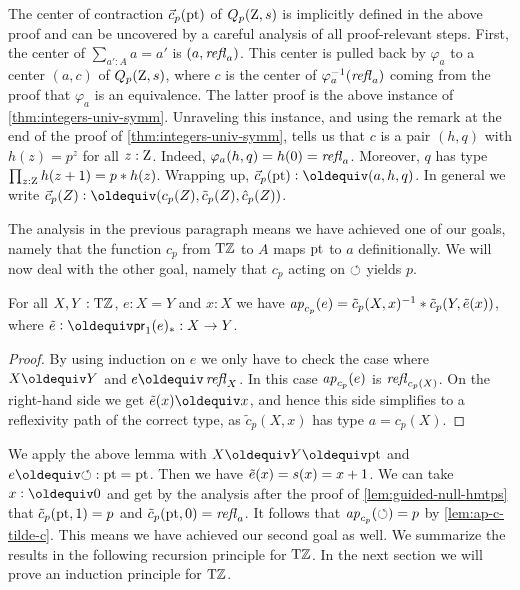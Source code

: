 \documentclass[a4,12pt]{amsart}
\begin{document}
The center of contraction $\vec{c}_p({\mathord{\mathrm{pt}}})$ of $Q_p(\mathrm{Z},s)$ is 
implicitly defined in the above proof 
and can be uncovered by a careful analysis of all proof-relevant steps.
First, the center of $\sum_{a':A} a=a'$ is $(a,\mathop{{\it refl}_{a}})$.
This center is pulled back by $\varphi_{a}$ to a center
$(a,c)$ of $Q_p(\mathrm{Z},s)$, where $c$ is the center of 
$\varphi_{a}^{-1}(\mathop{{\it refl}_{a}})$ coming from the proof
that $\varphi_{a}$ is an equivalence. The latter proof
is the above instance of \cref{thm:integers-univ-symm}.
Unraveling this instance, and using the remark at the
end of the proof of \cref{thm:integers-univ-symm},
tells us that $c$ is a pair $(h,q)$ with $h(z)=p^z$
for all $z:\mathrm{Z}$. Indeed, $\varphi_{a}(h,q) = h(0) = \mathop{{\it refl}_{a}}$.
Moreover, $q$ has type $\prod_{z:\mathrm{Z}} h(z+1)=p* h(z)$.
Wrapping up, $\vec c_p(\pt)\defeq (a,h,q)$. In general we write
$\vec{c}_p(Z)\defeq(c_p(Z),\tilde{c}_p(Z),\hat{c}_p(Z))$.

The analysis in the previous paragraph
means we have achieved one of our goals,
namely that the function $c_p$ from ${\mathrm{T}\mathbb{Z}}$ to $A$ 
maps ${\mathord{\mathrm{pt}}}$ to $a$ definitionally.
We will now deal with the other goal,
namely that $c_p$ acting on $\circlearrowleft$ yields $p$.

\begin{lemma}\label{lem:ap-c-tilde-c}
For all $X,Y:{\mathrm{T}\mathbb{Z}}$, $e: X=Y$ and $x:X$ we have
$\mathop{{\it ap}_{c_p}}(e) = \tilde c_p(X,x)^{-1}* \tilde c_p(Y,\tilde {e}(x))$,
where $\ptoe{e}\defeq \mathsf{pr}_1(e)_* : X\to Y$.
\end{lemma}
\begin{proof}
By using induction on $e$ we only have to check the case where
$X\jdeq Y$ and $e\jdeq\refl{X}$. In this case $\mathop{{\it ap}_{c_p}}(e)$ is
$\mathop{{\it refl}_{c_p(X)}}$. On the right-hand side we get $\ptoe{e}(x)\jdeq x$,
and hence this side simplifies to a reflexivity path of
the correct type, as $\tilde c_p(X,x)$ has type $a=c_p(X)$.
\end{proof}

We apply the above lemma with $X\jdeq Y\jdeq \pt$ and $e\jdeq{\Zloop}: \pt=\pt$.
Then we have $\tilde {e}(x)=s(x)=x+1$. We can take $x\defeq 0$ and get by
the analysis after the proof of \cref{lem:guided-null-hmtps}
that $\tilde c_p({\mathord{\mathrm{pt}}},1) = p$ and $\tilde c_p({\mathord{\mathrm{pt}}},0) = \mathop{{\it refl}_{a}}$.
It follows that $\mathop{{\it ap}_{c_p}}(\circlearrowleft) = p$ by \cref{lem:ap-c-tilde-c}.
This means we have achieved our second goal as well.
We summarize the results in the following recursion principle for ${\mathrm{T}\mathbb{Z}}$.
In the next section we will prove an induction principle for ${\mathrm{T}\mathbb{Z}}$.
\end{document}
